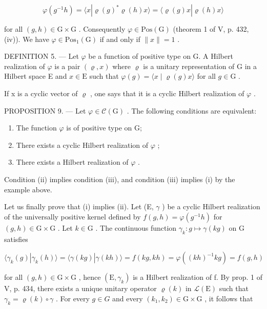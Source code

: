 \[
\varphi (g ^ {- 1} h) = \langle x | \varrho (g) ^ {*} \varrho (h) x \rangle = \langle \varrho (g) x | \varrho (h) x \rangle
\]

for all \((g,h)\in\mathrm{G}\times\mathrm{G}\) . Consequently \(\varphi\in\mathrm{Pos}(\mathrm{G})\) (theorem 1 of V, p. 432, (iv)). We have \(\varphi\in\mathrm{Pos}_{1}(\mathrm{G})\) if and only if \(\|x\|=1\) .

DEFINITION 5. --- Let \(\varphi\) be a function of positive type on G. A Hilbert realization of \(\varphi\) is a pair \((\varrho, x)\) where \(\varrho\) is a unitary representation of G in a Hilbert space E and \(x \in \mathrm{E}\) such that \(\varphi(g) = \langle x \mid \varrho(g)x \rangle\) for all \(g \in \mathrm{G}\) .

If x is a cyclic vector of \(\varrho\) , one says that it is a cyclic Hilbert realization of \(\varphi\) .

PROPOSITION 9. --- Let \(\varphi\in\mathcal{C}(\mathrm{G})\) . The following conditions are equivalent:

\begin{enumerate}
\def\labelenumi{(\roman{enumi})}
\item
  The function \(\varphi\) is of positive type on G;
\item
  There exists a cyclic Hilbert realization of \(\varphi\) ;
\item
  There exists a Hilbert realization of \(\varphi\) .
\end{enumerate}

Condition (ii) implies condition (iii), and condition (iii) implies (i) by the example above.

Let us finally prove that (i) implies (ii). Let (E, \(\gamma\) ) be a cyclic Hilbert realization of the universally positive kernel defined by \(f(g,h)=\varphi(g^{-1}h)\) for \((g,h)\in\mathrm{G}\times\mathrm{G}\) . Let \(k\in\mathrm{G}\) . The continuous function \(\gamma_{k}:g\mapsto\gamma(kg)\) on G satisfies

\[
\langle \gamma_ {k} (g) | \gamma_ {k} (h) \rangle = \langle \gamma (k g) | \gamma (k h) \rangle = f (k g, k h) = \varphi ((k h) ^ {- 1} k g) = f (g, h)
\]

for all \((g,h)\in\mathrm{G}\times\mathrm{G}\) , hence \((\mathrm{E},\gamma_{k})\) is a Hilbert realization of f. By prop. 1 of V, p. 434, there exists a unique unitary operator \(\varrho(k)\) in \(\mathcal{L}(\mathrm{E})\) such that \(\gamma_{k}=\varrho(k)\circ\gamma\) . For every \(g\in G\) and every \((k_{1},k_{2})\in\mathrm{G}\times\mathrm{G}\) , it follows that

